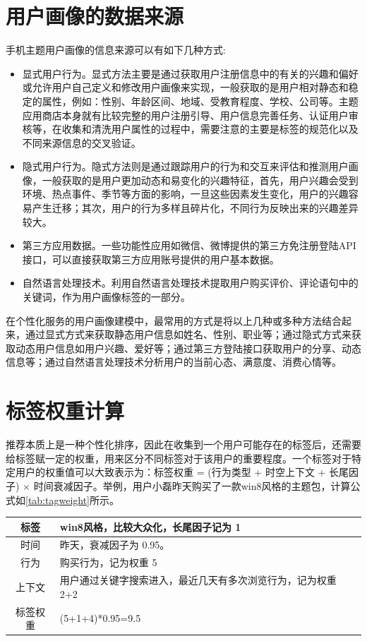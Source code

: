     \section{用户画像的数据来源}
    手机主题用户画像的信息来源可以有如下几种方式:
    \begin{itemize}
    \item 显式用户行为。显式方法主要是通过获取用户注册信息中的有关的兴趣和偏好或允许用户自己定义和修改用户画像来实现，一般获取的是用户相对静态和稳定的属性，例如：性别、年龄区间、地域、受教育程度、学校、公司等。主题应用商店本身就有比较完整的用户注册引导、用户信息完善任务、认证用户审核等，在收集和清洗用户属性的过程中，需要注意的主要是标签的规范化以及不同来源信息的交叉验证。
    \item 隐式用户行为。隐式方法则是通过跟踪用户的行为和交互来评估和推测用户画像，一般获取的是用户更加动态和易变化的兴趣特征，首先，用户兴趣会受到环境、热点事件、季节等方面的影响，一旦这些因素发生变化，用户的兴趣容易产生迁移；其次，用户的行为多样且碎片化，不同行为反映出来的兴趣差异较大。
    \item 第三方应用数据。一些功能性应用如微信、微博提供的第三方免注册登陆API接口，可以直接获取第三方应用账号提供的用户基本数据。
    \item 自然语言处理技术。利用自然语言处理技术提取用户购买评价、评论语句中的关键词，作为用户画像标签的一部分。
    \end{itemize}

    在个性化服务的用户画像建模中，最常用的方式是将以上几种或多种方法结合起来，通过显式方式来获取静态用户信息如姓名、性别、职业等；通过隐式方式来获取动态用户信息如用户兴趣、爱好等；通过第三方登陆接口获取用户的分享、动态信息等；通过自然语言处理技术分析用户的当前心态、满意度、消费心情等。

    \section{标签权重计算}
    推荐本质上是一种个性化排序，因此在收集到一个用户可能存在的标签后，还需要给标签赋一定的权重，用来区分不同标签对于该用户的重要程度。一个标签对于特定用户的权重值可以大致表示为：标签权重 = (行为类型 + 时空上下文 + 长尾因子) × 时间衰减因子。举例，用户小磊昨天购买了一款win8风格的主题包，计算公式如\autoref{tab:tagweight}所示。
    \begin{table}[htp]
    \centering
    \label{tab:tagweight}
    \begin{tabular}{|c|p{8cm}|} \hline
     标签 & win8风格，比较大众化，长尾因子记为 1 \\ \hline
     时间 & 昨天，衰减因子为 0.95。 \\ \hline
     行为 & 购买行为，记为权重 5 \\ \hline
     上下文 & 用户通过关键字搜索进入，最近几天有多次浏览行为，记为权重 2+2 \\ \hline
     标签权重 &  (5+1+4)*0.95=9.5 \\ \hline
    \end{tabular}
    \end{table}

